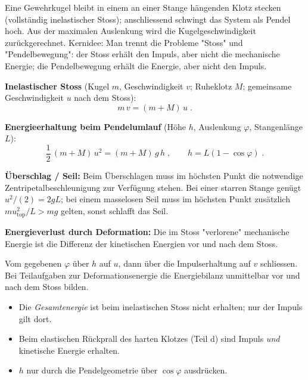 
Eine Gewehrkugel bleibt in einem an einer Stange hängenden Klotz stecken
(vollständig inelastischer Stoss); anschliessend schwingt das System als
Pendel hoch. Aus der maximalen Auslenkung wird die Kugelgeschwindigkeit
zurückgerechnet. Kernidee: Man trennt die Probleme "Stoss" und
"Pendelbewegung": der Stoss erhält den Impuls, aber nicht die mechanische
Energie; die Pendelbewegung erhält die Energie, aber nicht den Impuls.

\begin{werkzeugkasten}[Werkzeuge]
\textbf{Inelastischer Stoss} (Kugel $m$, Geschwindigkeit $v$; Ruheklotz $M$;
gemeinsame Geschwindigkeit $u$ nach dem Stoss):
\begin{equation}
  m\,v = (m+M)\,u\;.
\end{equation}

\textbf{Energieerhaltung beim Pendelumlauf} (Höhe $h$, Auslenkung $\varphi$,
Stangenlänge $L$):
\begin{equation}
  \frac12\,(m+M)\,u^2 = (m+M)\,g\,h\;,
  \qquad h = L(1-\cos\varphi)\;.
\end{equation}

\textbf{Überschlag / Seil:} Beim Überschlagen muss im höchsten Punkt die
notwendige Zentripetalbeschleunigung zur Verfügung stehen. Bei einer starren
Stange genügt $u^2/(2)=2gL$; bei einem masselosen Seil muss im höchsten Punkt
zusätzlich $mu_{\mathrm{top}}^2/L > mg$ gelten, sonst schlafft das Seil.

\textbf{Energieverlust durch Deformation:} Die im Stoss "verlorene"
mechanische Energie ist die Differenz der kinetischen Energien vor und nach
dem Stoss.
\end{werkzeugkasten}

\begin{werkzeugkasten}
Vom gegebenen $\varphi$ über $h$ auf $u$, dann über die Impulserhaltung auf
$v$ schliessen. Bei Teilaufgaben zur Deformationsenergie die
Energiebilanz unmittelbar vor und nach dem Stoss bilden.
\end{werkzeugkasten}

\begin{achtung}
\begin{itemize}
  \item Die \emph{Gesamtenergie} ist beim inelastischen Stoss nicht erhalten;
       nur der Impuls gilt dort.
  \item Beim elastischen Rückprall des harten Klotzes (Teil d) sind Impuls
       \emph{und} kinetische Energie erhalten.
  \item $h$ nur durch die Pendelgeometrie über $\cos\varphi$ ausdrücken.
\end{itemize}
\end{achtung}